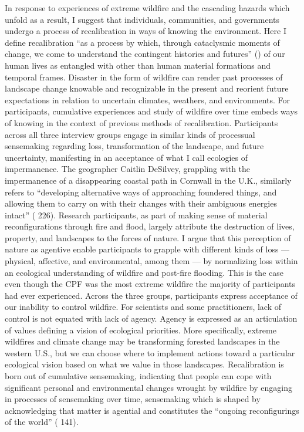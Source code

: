 \documentclass[
]{article}
\begin{document}
In response to experiences of extreme wildfire and the cascading hazards which unfold as a result, I suggest that individuals, communities, and governments undergo a process of recalibration in ways of knowing the environment. Here I define recalibration ``as a process by which, through cataclysmic moments of change, we come to understand the contingent histories and futures'' () of our human lives as entangled with other than human material formations and temporal frames. Disaster in the form of wildfire can render past processes of landscape change knowable and recognizable in the present and reorient future expectations in relation to uncertain climates, weathers, and environments. For participants, cumulative experiences and study of wildfire over time embeds ways of knowing in the context of previous methods of recalibration. Participants across all three interview groups engage in similar kinds of processual sensemaking regarding loss, transformation of the landscape, and future uncertainty, manifesting in an acceptance of what I call ecologies of impermanence. The geographer Caitlin DeSilvey, grappling with the impermanence of a disappearing coastal path in Cornwall in the U.K., similarly refers to ``developing alternative ways of approaching foundered things, and allowing them to carry on with their changes with their ambiguous energies intact'' ( 226). Research participants, as part of making sense of material reconfigurations through fire and flood, largely attribute the destruction of lives, property, and landscapes to the forces of nature. I argue that this perception of nature as agentive enable participants to grapple with different kinds of loss --- physical, affective, and environmental, among them --- by normalizing loss within an ecological understanding of wildfire and post-fire flooding. This is the case even though the CPF was the most extreme wildfire the majority of participants had ever experienced. Across the three groups, participants express acceptance of our inability to control wildfire. For scientists and some practitioners, lack of control is not equated with lack of agency. Agency is expressed as an articulation of values defining a vision of ecological priorities. More specifically, extreme wildfires and climate change may be transforming forested landscapes in the western U.S., but we can choose where to implement actions toward a particular ecological vision based on what we value in those landscapes. Recalibration is born out of cumulative sensemaking, indicating that people can cope with significant personal and environmental changes wrought by wildfire by engaging in processes of sensemaking over time, sensemaking which is shaped by acknowledging that matter is agential and constitutes the ``ongoing reconfigurings of the world'' ( 141).
\end{document}
